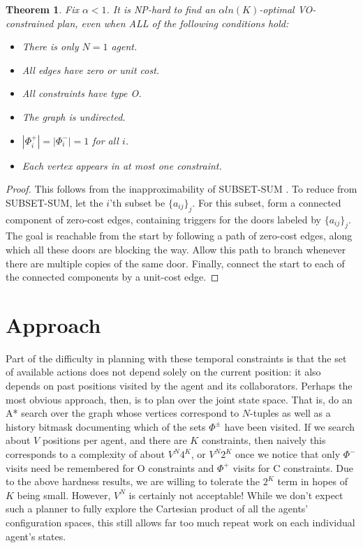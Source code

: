 \documentclass[letterpaper]{article}
\newtheorem{thm}{Theorem}
\begin{document}
\begin{thm}
Fix $\alpha < 1$. It is NP-hard to find an $\alpha ln(K)$-optimal VO-constrained plan, even when ALL of the following conditions hold:
\begin{itemize}
\item There is only $N=1$ agent.
\item All edges have zero or unit cost.
\item All constraints have type O.
\item The graph is undirected.
\item $|\Phi_i^+| = |\Phi_i^-| = 1$ for all $i$.
\item Each vertex appears in at most one constraint.
\end{itemize}
\end{thm}

\begin{proof}
This follows from the inapproximability of SUBSET-SUM \cite{moshkovitz2012projection}. To reduce from SUBSET-SUM, let the $i$'th subset be $\{a_{ij}\}_j$. For this subset, form a connected component of zero-cost edges, containing triggers for the doors labeled by $\{a_{ij}\}_j$. The goal is reachable from the start by following a path of zero-cost edges, along which all these doors are blocking the way. Allow this path to branch whenever there are multiple copies of the same door. Finally, connect the start to each of the connected components by a unit-cost edge.
\end{proof}

\section{Approach}

Part of the difficulty in planning with these temporal constraints is that the set of available actions does not depend solely on the current position: it also depends on past positions visited by the agent and its collaborators. Perhaps the most obvious approach, then, is to plan over the joint state space. That is, do an A* search over the graph whose vertices correspond to $N$-tuples as well as a history bitmask documenting which of the sets $\Phi^\pm$ have been visited. If we search about $V$ positions per agent, and there are $K$ constraints, then naively this corresponds to a complexity of about $V^N4^K$, or $V^N2^K$ once we notice that only $\Phi^-$ visits need be remembered for O constraints and $\Phi^+$ visits for C constraints. Due to the above hardness results, we are willing to tolerate the $2^K$ term in hopes of $K$ being small. However, $V^N$ is certainly not acceptable! While we don't expect such a planner to fully explore the Cartesian product of all the agents' configuration spaces, this still allows far too much repeat work on each individual agent's states.
\end{document}
